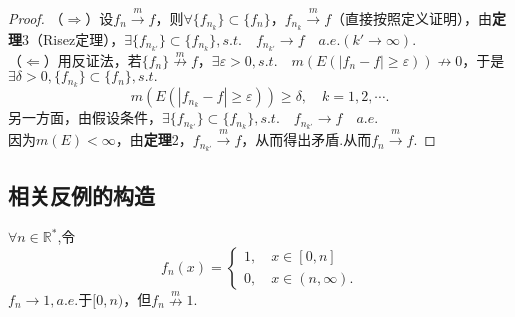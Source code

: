 \documentclass[bwprint, withoutpreface]{cumcmthesis}
\begin{document}
\begin{proof}
	（$\Rightarrow$）设$f_n \stackrel{m}{\longrightarrow}f$，则$\forall \{f_{n_k}\} \subset \{f_n\}$，$f_{n_k} \stackrel{m}{\longrightarrow} f$（直接按照定义证明），由\textbf{定理$3$}（Risez定理），$\exists \{f_{n_{k'}}\} \subset \{f_{n_k}\}, s.t. \quad f_{n_{k'}} \to f \quad a.e. (k' \to \infty).$ \\
	（$\Leftarrow$）用反证法，若$\{f_n\} \stackrel{m}{\nrightarrow} f$，$\exists \varepsilon > 0, s.t. \quad m(E(|f_n - f| \geqslant \varepsilon)) \nrightarrow 0$，于是$\exists \delta > 0, \{f_{n_k}\} \subset \{f_n\}, s.t.$ \[m(E(|f_{n_k} - f| \geqslant \varepsilon)) \geqslant \delta, \quad k = 1, 2, \cdots.\]另一方面，由假设条件，$\exists \{f_{n_{k'}}\} \subset \{f_{n_k}\}, s.t. \quad f_{n_{k'}} \to f \quad a.e.$ \\
	因为$m(E) < \infty$，由\textbf{定理$2$}，$f_{n_{k'}} \stackrel{m}{\longrightarrow} f$，从而得出矛盾.从而$f_n \stackrel{m}{\longrightarrow} f$.
\end{proof}

\subsection{相关反例的构造}
\begin{example}[几乎处处收敛不能推出依测度收敛]
	$\forall n \in \mathbb{R}^*$,令
	\begin{equation*}
	f_n(x) = 
	\begin{cases}
		1, \quad x \in [0, n] \\
		0, \quad x \in (n, \infty).
	\end{cases}
	\end{equation*}
	$f_n \to 1, a.e. \mbox{于}[0, n)$，但$f_n \stackrel{m}{\nrightarrow} 1.$
\end{example}
\end{document}
